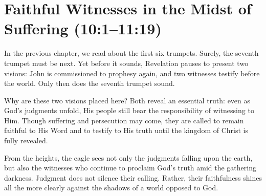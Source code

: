 \chapter{Faithful Witnesses in the Midst of Suffering (10:1--11:19)}

In the previous chapter, we read about the first six trumpets. Surely, the seventh trumpet must be next. Yet before it sounds, Revelation pauses to present two visions: John is commissioned to prophesy again, and two witnesses testify before the world. Only then does the seventh trumpet sound.

Why are these two visions placed here? Both reveal an essential truth: even as God's judgments unfold, His people still bear the responsibility of witnessing to Him. Though suffering and persecution may come, they are called to remain faithful to His Word and to testify to His truth until the kingdom of Christ is fully revealed.

From the heights, the eagle sees not only the judgments falling upon the earth, but also the witnesses who continue to proclaim God's truth amid the gathering darkness. Judgment does not silence their calling. Rather, their faithfulness shines all the more clearly against the shadows of a world opposed to God.

